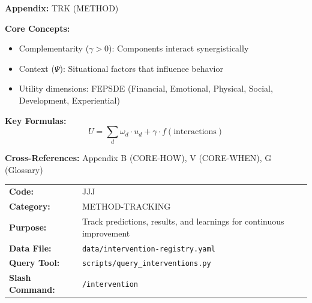\begin{tcolorbox}[colback=blue!5!white, colframe=blue!75!black,
    title=Quick Reference: Intervention Registry: Learning Loop System]

\textbf{Appendix:} TRK (METHOD)

\textbf{Core Concepts:}
\begin{itemize}[nosep]
\item Complementarity ($\gamma > 0$): Components interact synergistically
\item Context ($\Psi$): Situational factors that influence behavior
\item Utility dimensions: FEPSDE (Financial, Emotional, Physical, Social, Development, Experiential)
\end{itemize}

\textbf{Key Formulas:}
\begin{equation}
U = \sum_d \omega_d \cdot u_d + \gamma \cdot f(\text{interactions})
\end{equation}

\textbf{Cross-References:} Appendix B (CORE-HOW), V (CORE-WHEN), G (Glossary)
\end{tcolorbox}





\begin{tcolorbox}[colback=gray!5, colframe=gray!50, title=Appendix Metadata]
\begin{tabular}{ll}
\textbf{Code:} & JJJ \\
\textbf{Category:} & METHOD-TRACKING \\
\textbf{Purpose:} & Track predictions, results, and learnings for continuous improvement \\
\textbf{Data File:} & \texttt{data/intervention-registry.yaml} \\
\textbf{Query Tool:} & \texttt{scripts/query\_interventions.py} \\
\textbf{Slash Command:} & \texttt{/intervention} \\
\end{tabular}
\end{tcolorbox}

